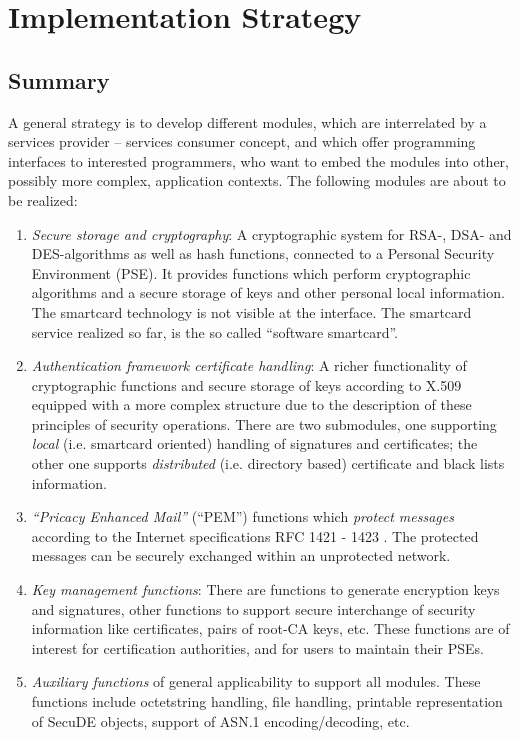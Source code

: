 \section{Implementation Strategy}
\thispagestyle{myheadings}
\label{isw}

\subsection{Summary}
\label{isw-is}

A general strategy is to develop different modules,
which are interrelated by a services provider -- services consumer concept,
and which offer programming interfaces to interested programmers,
who want to embed the modules into other, possibly more complex,
application contexts.
The following modules are about to be realized:

\begin{enumerate}
\item
{\em Secure storage and cryptography}:
A cryptographic system for RSA-, DSA- and DES-algorithms
as well as hash functions,
connected to a Personal Security Environment (PSE).
It provides functions which perform
cryptographic algorithms and a secure storage of keys and other
personal local information.
The smartcard technology
is not visible at the interface. The smartcard service realized
so far, is the so called ``software smartcard''.
\item
{\em Authentication framework certificate handling}:
A richer functionality
of cryptographic functions and secure storage of keys
according to X.509 equipped with a more complex structure
due to the description of these principles of security operations.
There are two submodules, one supporting
{\em local} (i.e. smartcard oriented)
handling of signatures and certificates;
the other one supports {\em distributed} (i.e. directory based)
certificate and black lists information.
\item
{\em ``Pricacy Enhanced Mail''} (``PEM'')
functions which {\em protect messages} according to the
Internet specifications RFC 1421 - 1423 \cite{rfc1}.
The protected messages can be securely
exchanged within an unprotected network.
\item
{\em Key management functions}:
There are functions to generate encryption keys and signatures,
other functions to support secure interchange of security information
like certificates, pairs of root-CA keys, etc.
These functions are of interest for certification authorities,
and for users to maintain their PSEs.
\item
{\em Auxiliary functions}
of general applicability to support all modules.
These functions include octetstring handling, file handling,
printable representation of SecuDE objects,
support of ASN.1 encoding/decoding, etc.
\end{enumerate}

